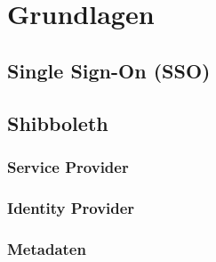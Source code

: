 \section{Grundlagen}\label{sec:grundlagen}
   \subsection{Single Sign-On (SSO)}\label{subsec:sso}
   \subsection{Shibboleth}\label{subsec:shibboleth}
      \subsubsection{Service Provider}\label{subsubsec:shib-sp}
      \subsubsection{Identity Provider}\label{subsubsec:shib-idp}
      \subsubsection{Metadaten}\label{subsubsec:shib-metadata}